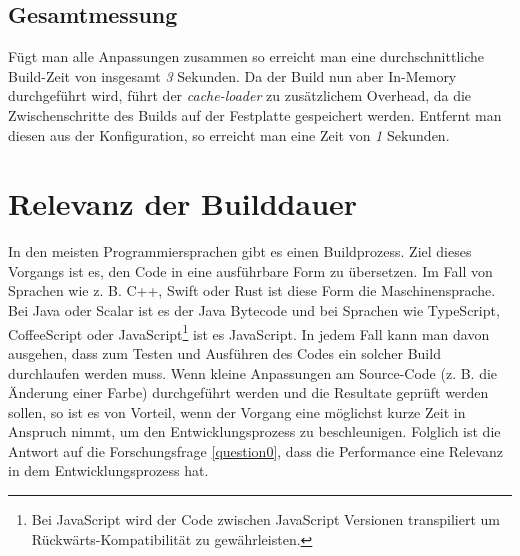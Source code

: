 \documentclass[11pt]{report}
\begin{document}
			\subsection{Gesamtmessung}
				Fügt man alle Anpassungen zusammen so erreicht man eine durchschnittliche Build-Zeit von insgesamt \emph{3} Sekunden. Da der Build nun aber In-Memory durchgeführt wird, führt der \emph{cache-loader} zu zusätzlichem Overhead, da die Zwischenschritte des Builds auf der Festplatte gespeichert werden. Entfernt man diesen aus der Konfiguration, so erreicht man eine Zeit von \emph{1} Sekunden.
				
		\section{Relevanz der Builddauer}
			In den meisten Programmiersprachen gibt es einen Buildprozess. Ziel dieses Vorgangs ist es, den Code in eine ausführbare Form zu übersetzen. Im Fall von Sprachen wie z. B. C++, Swift oder Rust ist diese Form die Maschinensprache. Bei Java oder Scalar ist es der Java Bytecode und bei Sprachen wie TypeScript, CoffeeScript oder JavaScript\footnote{Bei JavaScript wird der Code zwischen JavaScript Versionen transpiliert um Rückwärts-Kompatibilität zu gewährleisten.} ist es JavaScript. In jedem Fall kann man davon ausgehen, dass zum Testen und Ausführen des Codes ein solcher Build durchlaufen werden muss. Wenn kleine Anpassungen am Source-Code (z. B. die Änderung einer Farbe) durchgeführt werden und die Resultate geprüft werden sollen, so ist es von Vorteil, wenn der Vorgang eine möglichst kurze Zeit in Anspruch nimmt, um den Entwicklungsprozess zu beschleunigen. Folglich ist die Antwort auf die Forschungsfrage \ref{question0}, dass die Performance eine Relevanz in dem Entwicklungsprozess hat.
\end{document}
